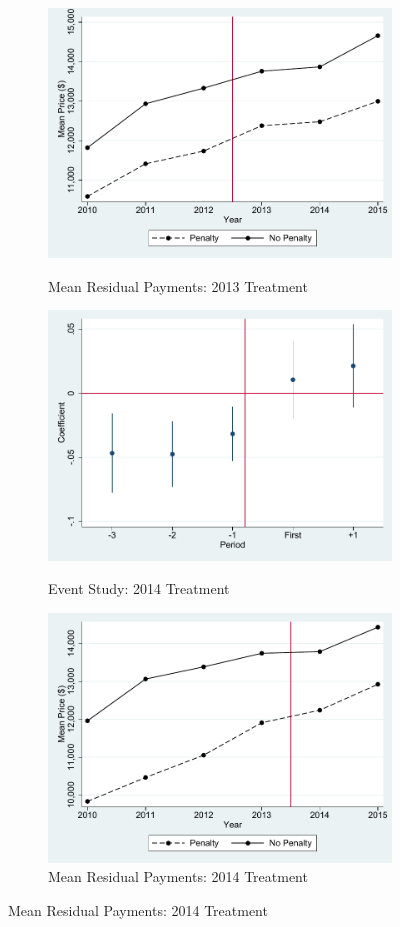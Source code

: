 \documentclass[12pt]{article}
\begin{document}
\begin{figure}[!htb]
\begin{subfigure}{.5\textwidth}
  \label{fig:sfig3}
\end{subfigure}%
\begin{subfigure}{.5\textwidth}
  \centering
  \caption{Mean Residual Payments: 2013 Treatment}
  \includegraphics[width=.8\linewidth]{price_resid_2013.pdf}
  \label{fig:sfig4}
\end{subfigure}%
\begin{subfigure}{.5\textwidth}
 \caption{Event Study: 2014 Treatment}
  \centering
  \includegraphics[width=.8\linewidth]{ev_lnprice_hcci_2014.pdf}
  \label{fig:sfig5}
\end{subfigure}%
\begin{subfigure}{.5\textwidth}
  \centering
  \caption{Mean Residual Payments: 2014 Treatment}
  \includegraphics[width=.8\linewidth]{price_resid_2014.pdf}

\end{subfigure}
\end{figure}
\end{document}
